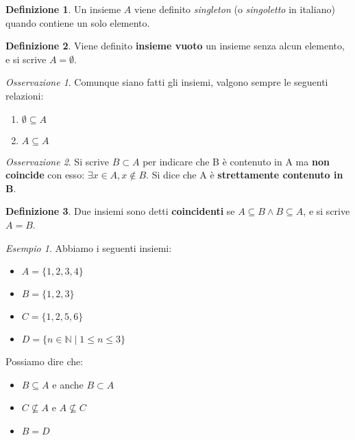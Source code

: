 \documentclass[a4paper, 12pt]{report}
\theoremstyle{definition}
\newtheorem{definition}{Definizione}[chapter]
\theoremstyle{remark}
\newtheorem{example}{Esempio}[definition]
\newtheorem{remark}{Osservazione}[definition]
\theoremstyle{plain}
\newcommand{\N}{\mathbb{N}}
\begin{document}
\begin{definition}
    Un insieme $A$ viene definito \textit{singleton} (o \textit{singoletto} in italiano) quando contiene un solo elemento.
\end{definition}

\begin{definition}
    Viene definito \textbf{insieme vuoto} un insieme senza alcun elemento, e si scrive $A = \emptyset$.
\end{definition}

\begin{remark}
    Comunque siano fatti gli insiemi, valgono sempre le seguenti relazioni:
    \begin{enumerate}
        \item $\emptyset \subseteq A$
        \item $A \subseteq A$
    \end{enumerate}
\end{remark}

\begin{remark}
    Si scrive $B \subset A$ per indicare che B è contenuto in A ma \textbf{non coincide} con esso: $\exists x \in A, x \notin B$. Si dice che A è \textbf{strettamente contenuto in B}.
\end{remark}

\begin{definition}
    Due insiemi sono detti \textbf{coincidenti} se $A \subseteq B \land B \subseteq A$, e si scrive $A = B$.
\end{definition}

\begin{example}
    Abbiamo i seguenti insiemi:
    \begin{itemize}
        \item $A = \{1, 2, 3, 4\}$
        \item $B = \{1, 2, 3\}$
        \item $C = \{1, 2, 5, 6\}$
        \item $D = \{n \in \N \mid 1 \leq n \leq 3\}$
    \end{itemize}
    Possiamo dire che:
    \begin{itemize}
        \item $B \subseteq A$ e anche $B \subset A$
        \item $C \nsubseteq A$ e $A \nsubseteq C$
        \item $B = D$
    \end{itemize}
\end{example}
\end{document}
